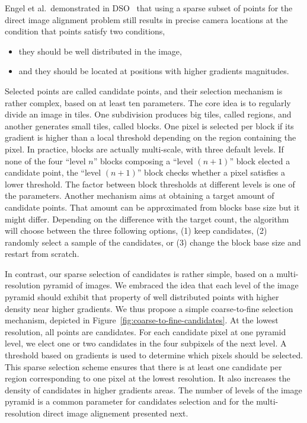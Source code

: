 Engel et al.\ demonstrated in DSO~\cite{engel2017direct} that using a sparse subset
of points for the direct image alignment problem still results in precise camera locations
at the condition that points satisfy two conditions,
\begin{itemize}
\setlength\itemsep{-0.5em}
	\item they should be well distributed in the image,
	\item and they should be located at positions with higher gradients magnitudes.
\end{itemize}
Selected points are called candidate points,
and their selection mechanism is rather complex, based on at least ten parameters.
The core idea is to regularly divide an image in tiles.
One subdivision produces big tiles, called regions,
and another generates small tiles, called blocks.
One pixel is selected per block if its gradient is higher than a local threshold
depending on the region containing the pixel.
In practice, blocks are actually multi-scale, with three default levels.
If none of the four ``level $n$'' blocks composing a ``level $(n+1)$'' block elected a candidate point,
the ``level $(n+1)$'' block checks whether a pixel satisfies a lower threshold.
The factor between block thresholds at different levels is one of the parameters.
Another mechanism aims at obtaining a target amount of candidate points.
That amount can be approximated from blocks base size but it might differ.
Depending on the difference with the target count,
the algorithm will choose between the three following options,
(1) keep candidates, (2) randomly select a sample of the candidates,
or (3) change the block base size and restart from scratch.

In contrast, our sparse selection of candidates is rather simple,
based on a multi-resolution pyramid of images.
We embraced the idea that each level of the image pyramid should exhibit
that property of well distributed points with higher density near higher gradients.
We thus propose a simple coarse-to-fine selection mechanism,
depicted in Figure~\ref{fig:coarse-to-fine-candidates}.
At the lowest resolution, all points are candidates.
For each candidate pixel at one pyramid level, we elect one or two candidates
in the four subpixels of the next level.
A threshold based on gradients is used to determine which pixels should be selected.
This sparse selection scheme ensures that there is at least one candidate per region
corresponding to one pixel at the lowest resolution.
It also increases the density of candidates in higher gradients areas.
The number of levels of the image pyramid is a common parameter for candidates selection
and for the multi-resolution direct image alignement presented next.


